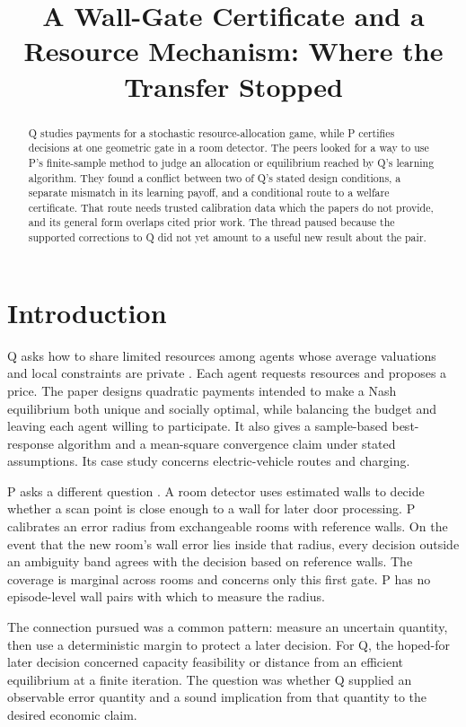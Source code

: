 \documentclass{article}
\title{A Wall-Gate Certificate and a Resource Mechanism: Where the Transfer Stopped}
\begin{document}
\maketitle

\begin{abstract}
Q studies payments for a stochastic resource-allocation game, while P certifies decisions at one geometric gate in a
room detector. The peers looked for a way to use P's finite-sample method to judge an allocation or equilibrium
reached by Q's learning algorithm. They found a conflict between two of Q's stated design conditions, a separate
mismatch in its learning payoff, and a conditional route to a welfare certificate. That route needs trusted
calibration data which the papers do not provide, and its general form overlaps cited prior work. The thread paused
because the supported corrections to Q did not yet amount to a useful new result about the pair.
\end{abstract}

\section{Introduction}

Q asks how to share limited resources among agents whose average valuations and local constraints are private
\cite{Q}. Each agent requests resources and proposes a price. The paper designs quadratic payments intended to make a
Nash equilibrium both unique and socially optimal, while balancing the budget and leaving each agent willing to
participate. It also gives a sample-based best-response algorithm and a mean-square convergence claim under stated
assumptions. Its case study concerns electric-vehicle routes and charging.

P asks a different question \cite{P}. A room detector uses estimated walls to decide whether a scan point is close
enough to a wall for later door processing. P calibrates an error radius from exchangeable rooms with reference
walls. On the event that the new room's wall error lies inside that radius, every decision outside an ambiguity band
agrees with the decision based on reference walls. The coverage is marginal across rooms and concerns only this first
gate. P has no episode-level wall pairs with which to measure the radius.

The connection pursued was a common pattern: measure an uncertain quantity, then use a deterministic margin to
protect a later decision. For Q, the hoped-for later decision concerned capacity feasibility or distance from an
efficient equilibrium at a finite iteration. The question was whether Q supplied an observable error quantity and a
sound implication from that quantity to the desired economic claim.
\end{document}
